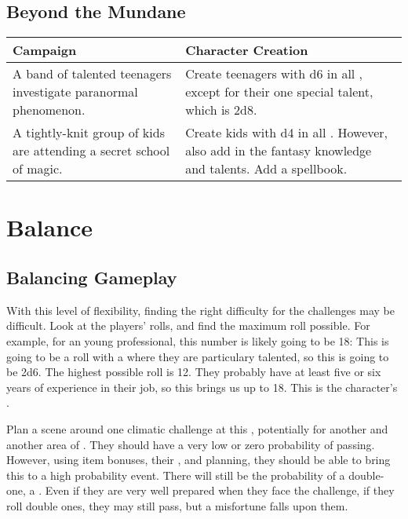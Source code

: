 \documentclass{LegrandOrangeTufteBook}
\begin{document}
\subsection*{Beyond the Mundane}
\begin{center}
	\begin{xltabular}{\textwidth}{XX}
		Campaign & Character Creation \\
		\hline
		A band of talented teenagers investigate paranormal phenomenon. & Create teenagers with d6 in all , except for their one special talent, which is 2d8.\\
   		A tightly-knit group of kids are attending a secret school of magic. & Create kids with d4 in all . However, also add in the fantasy knowledge and talents. Add a spellbook. \\
	\end{xltabular}
\end{center}

\section*{Balance}

\subsection*{Balancing Gameplay}

With this level of flexibility, finding the right difficulty for the challenges may be difficult. Look at the players' rolls, and find the maximum roll possible. For example, for an young professional,
this number is likely going to be 18: This is going to be a roll with a  where they are particulary talented, so this is going to be 2d6. The highest possible roll is 12. They probably have at least five or six years of experience in their job, so this brings us up to 18. This is the character's .

Plan a scene around one climatic challenge at this , potentially for another  and another area of . They should have a very low or zero probability of passing. However, using item bonuses, their , and planning, they should be able to bring this to a high probability event. There will still be the probability of a double-one, a . Even if they are very well prepared when they face the challenge, if they roll double ones, they may still pass, but a misfortune falls upon them.
\end{document}
